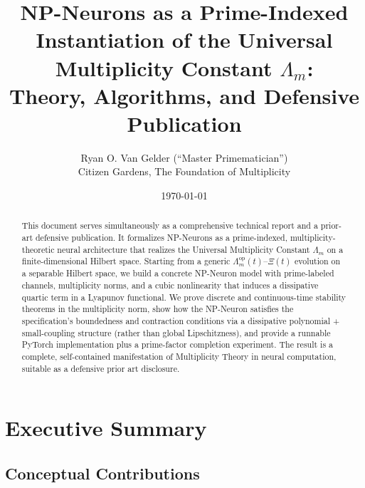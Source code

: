 \documentclass[11pt]{article}
\title{NP-Neurons as a Prime-Indexed Instantiation of the Universal Multiplicity Constant
\(\Lambda_m\): \\
Theory, Algorithms, and Defensive Publication}
\author{Ryan O. Van Gelder (``Master Primematician'') \\ Citizen Gardens, The Foundation of Multiplicity}
\date{\today}
\begin{document}
\maketitle

\begin{abstract}
This document serves simultaneously as a comprehensive technical report and a prior-art defensive publication.
It formalizes NP-Neurons as a prime-indexed, multiplicity-theoretic neural architecture that realizes the Universal Multiplicity Constant \(\Lambda_m\) on a finite-dimensional Hilbert space.
Starting from a generic \(\Lambda_m^{\mathrm{op}}(t)\)–\(\Xi(t)\) evolution on a separable Hilbert space, we build a concrete NP-Neuron model with prime-labeled channels, multiplicity norms, and a cubic nonlinearity that induces a dissipative quartic term in a Lyapunov functional.
We prove discrete and continuous-time stability theorems in the multiplicity norm, show how the NP-Neuron satisfies the specification's boundedness and contraction conditions via a dissipative polynomial + small-coupling structure (rather than global Lipschitzness), and provide a runnable PyTorch implementation plus a prime-factor completion experiment.
The result is a complete, self-contained manifestation of Multiplicity Theory in neural computation, suitable as a defensive prior art disclosure.
\end{abstract}

\tableofcontents

\section{Executive Summary}

\subsection{Conceptual Contributions}
\end{document}
